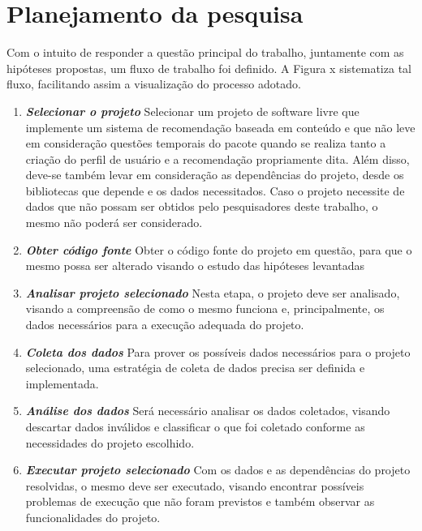 \section{Planejamento da pesquisa}

Com o intuito de responder a questão principal do trabalho, juntamente com as hipóteses propostas, um fluxo de trabalho foi definido. A Figura x sistematiza tal fluxo, facilitando assim a visualização do processo adotado.

\begin{enumerate}
    \item \textit{\textbf{Selecionar o projeto}}
Selecionar um projeto de software livre que implemente um sistema de recomendação baseada em conteúdo e que não leve em consideração questões temporais do pacote quando se realiza tanto a criação do perfil de usuário e a recomendação propriamente dita. Além disso, deve-se também levar em consideração as dependências do projeto, desde os bibliotecas que depende e os dados necessitados. Caso o projeto necessite de dados que não possam ser obtidos pelo pesquisadores deste trabalho, o mesmo não poderá ser considerado.

    \item \textit{\textbf{Obter código fonte}}
Obter o código fonte do projeto em questão, para que o mesmo possa ser alterado visando o estudo das hipóteses levantadas

    \item \textit{\textbf{Analisar projeto selecionado}}
Nesta etapa, o projeto deve ser analisado, visando a compreensão de como o mesmo funciona e, principalmente, os dados necessários para a execução adequada do projeto.

    \item \textit{\textbf{Coleta dos dados}}
Para prover os possíveis dados necessários para o projeto selecionado, uma estratégia de coleta de dados precisa ser definida e implementada.

    \item \textit{\textbf{Análise dos dados}}
Será necessário analisar os dados coletados, visando descartar dados inválidos e classificar o que foi coletado conforme as necessidades do projeto escolhido.

    \item \textit{\textbf{Executar projeto selecionado}}
Com os dados e as dependências do projeto resolvidas, o mesmo deve ser executado, visando encontrar possíveis problemas de execução que não foram previstos e também observar as funcionalidades do projeto.


\end{enumerate}
